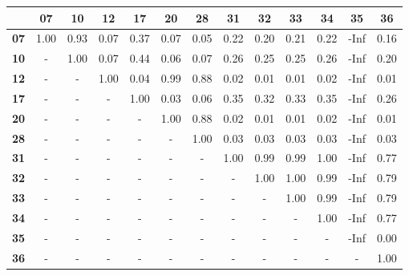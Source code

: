 \begin{tiny}\begin{tabular}{|l|c|c|c|c|c|c|c|c|c|c|c|c|}
\hline
&\textbf{07}&\textbf{10}&\textbf{12}&\textbf{17}&\textbf{20}&\textbf{28}&\textbf{31}&\textbf{32}&\textbf{33}&\textbf{34}&\textbf{35}&\textbf{36}\\\hline
\textbf{07}&1.00&0.93&0.07&0.37&0.07&0.05&0.22&0.20&0.21&0.22&-Inf&0.16\\\hline
\textbf{10}&-&1.00&0.07&0.44&0.06&0.07&0.26&0.25&0.25&0.26&-Inf&0.20\\\hline
\textbf{12}&-&-&1.00&0.04&0.99&0.88&0.02&0.01&0.01&0.02&-Inf&0.01\\\hline
\textbf{17}&-&-&-&1.00&0.03&0.06&0.35&0.32&0.33&0.35&-Inf&0.26\\\hline
\textbf{20}&-&-&-&-&1.00&0.88&0.02&0.01&0.01&0.02&-Inf&0.01\\\hline
\textbf{28}&-&-&-&-&-&1.00&0.03&0.03&0.03&0.03&-Inf&0.03\\\hline
\textbf{31}&-&-&-&-&-&-&1.00&0.99&0.99&1.00&-Inf&0.77\\\hline
\textbf{32}&-&-&-&-&-&-&-&1.00&1.00&0.99&-Inf&0.79\\\hline
\textbf{33}&-&-&-&-&-&-&-&-&1.00&0.99&-Inf&0.79\\\hline
\textbf{34}&-&-&-&-&-&-&-&-&-&1.00&-Inf&0.77\\\hline
\textbf{35}&-&-&-&-&-&-&-&-&-&-&-Inf&0.00\\\hline
\textbf{36}&-&-&-&-&-&-&-&-&-&-&-&1.00\\\hline
\end{tabular}
\end{tiny}